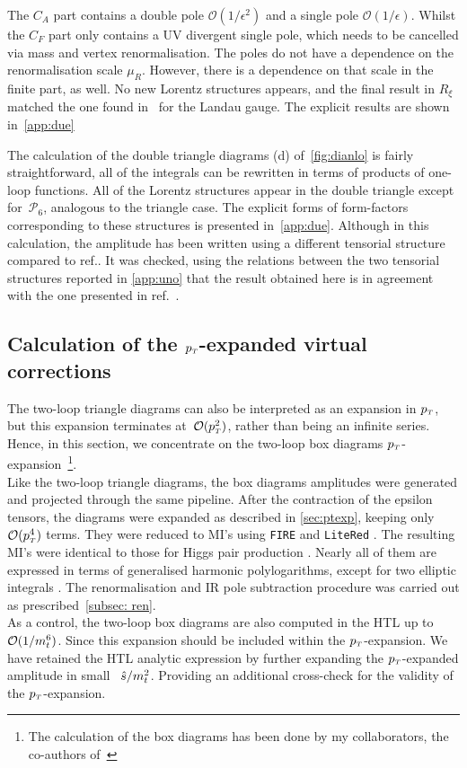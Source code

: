 The $C_A$ part contains a double pole $ \mathcal O( 1/\epsilon^2)$ and a single pole $ \mathcal O( 1/\epsilon)$. Whilst the $C_F$ part only contains a UV divergent single pole, which needs to be cancelled via mass and vertex renormalisation. The poles do not have a dependence on the renormalisation scale $ \mu_R$. However, there is a dependence on that scale in the finite part, as well.  No new Lorentz structures appears, and the final result in $R_\xi$ matched the one found in~\cite{Spira:1995rr,Aglietti:2006tp} for the Landau gauge. The explicit results are shown in~\autoref{app:due}
%
\par  The calculation of the double triangle diagrams (d) of~\autoref{fig:dianlo} is fairly straightforward, all of the 
integrals can be rewritten in terms of products of one-loop functions. All of the Lorentz structures appear in the double triangle except for~$\mathcal{P}_6$, analogous to the triangle case. The explicit forms of form-factors corresponding to these structures is presented in~\autoref{app:due}. Although in this calculation, the amplitude has been written using a different
tensorial structure compared to ref.\cite{Davies:2020drs}. It was  checked,
using the relations between the two tensorial structures reported in 
\autoref{app:uno} that the result obtained here is in agreement with the one presented
in ref.~\cite{Hasselhuhn:2016rqt}.
\subsection{Calculation of the $p_{\scriptscriptstyle T}$-expanded virtual corrections}
\par The two-loop triangle diagrams can also be interpreted as an expansion in $p_{\scriptscriptstyle T}$, but this expansion terminates at~${\cal O}(p_{\scriptscriptstyle T}^2)$, rather than being an infinite series. Hence, in this section, we concentrate on the two-loop box diagrams $p_{\scriptscriptstyle T}$-expansion~\footnote{The calculation of the box diagrams has been done by my collaborators, the co-authors of~\cite{Alasfar:2021ppe}}.\\
Like the two-loop triangle diagrams, the box diagrams amplitudes were generated and projected through the same pipeline. After the contraction of the epsilon tensors, the diagrams were expanded as
described in \autoref{sec:ptexp}, keeping only ${\cal O}(p_{\scriptscriptstyle T}^4)$ terms. They were reduced to MI's
using \texttt{FIRE} \cite{Smirnov:2014hma} and \texttt{LiteRed} \cite{Lee:2013mka}. The
resulting MI's were identical to those for Higgs pair
production \cite{Bonciani:2018omm}. Nearly all of them are expressed
in terms of generalised harmonic polylogarithms, except for
two elliptic integrals \cite{vonManteuffel:2017hms, Bonciani:2018uvv}. The renormalisation and IR pole subtraction procedure was carried out as prescribed~\autoref{subsec: ren}.\\
As a control, the two-loop box diagrams are also computed in the HTL up to  $\mathcal{O}(1/m_t^6)$. Since this expansion should be included within the $p_{\scriptscriptstyle T}$-expansion. We have retained the HTL analytic expression by further expanding the $p_{\scriptscriptstyle T}$-expanded amplitude in small ~$\hat{s}/m_t^2$. Providing an additional cross-check for the validity of the $p_{\scriptscriptstyle T}$-expansion.
